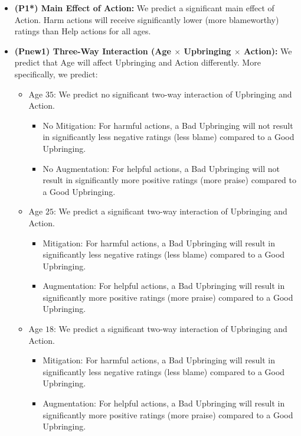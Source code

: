 \documentclass[scrarticle]{scrartcl}
\begin{document}
\begin{itemize}
   \item[--] \textsf{\textbf{(P1*) Main Effect of Action:}} We predict a significant main effect of Action. Harm actions will receive significantly lower (more blameworthy) ratings than Help actions for all ages.
   \item[--] \textsf{\textbf{(Pnew1) Three-Way Interaction (Age $\times$ Upbringing $\times$ Action):}} We predict that Age will affect Upbringing and Action differently. More specifically, we predict:
   \begin{itemize}
      \item[--] Age $35$: We predict no significant two-way interaction of Upbringing and Action.
      \begin{itemize}
         \item[--] No Mitigation: For harmful actions, a Bad Upbringing will not result in significantly less negative ratings (less blame) compared to a Good Upbringing.
         \item[--] No Augmentation: For helpful actions, a Bad Upbringing will not result in significantly more positive ratings (more praise) compared to a Good Upbringing.
      \end{itemize}
      \item[--] Age $25$: We predict a significant two-way interaction of Upbringing and Action.
      \begin{itemize}
         \item[--] Mitigation: For harmful actions, a Bad Upbringing will result in significantly less negative ratings (less blame) compared to a Good Upbringing.
         \item[--] Augmentation: For helpful actions, a Bad Upbringing will result in significantly more positive ratings (more praise) compared to a Good Upbringing.
      \end{itemize}
      \item[--] Age $18$: We predict a significant two-way interaction of Upbringing and Action.
      \begin{itemize}
         \item[--] Mitigation: For harmful actions, a Bad Upbringing will result in significantly less negative ratings (less blame) compared to a Good Upbringing.
         \item[--] Augmentation: For helpful actions, a Bad Upbringing will result in significantly more positive ratings (more praise) compared to a Good Upbringing.
      \end{itemize}
   \end{itemize}
\end{itemize}
\end{document}
